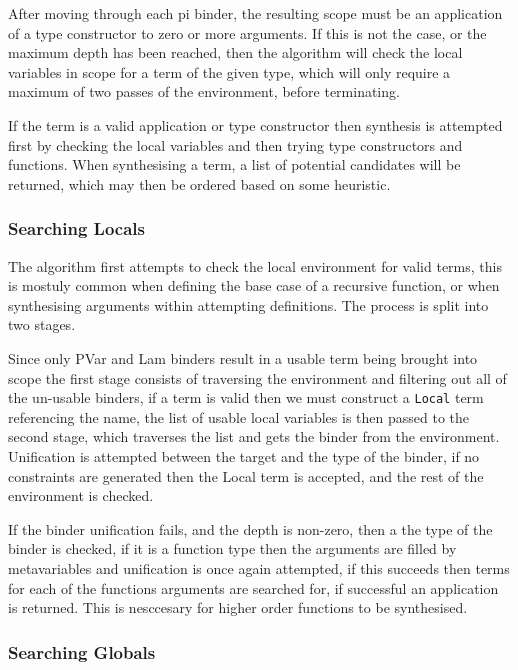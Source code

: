 \documentclass[a4paper]{article}
\begin{document}
After moving through each pi binder, the resulting scope must be an application of a type constructor to zero or more
arguments. If this is not the case, or the maximum depth has been reached, then the algorithm will check the local 
variables in scope for a term of the given type, which will only require a maximum of two passes of the environment,
before terminating. 

If the term is a valid application or type constructor then synthesis is attempted first by checking the 
local variables and then trying type constructors and functions. When synthesising a term, a list of potential 
candidates will be returned, which may then be ordered based on some heuristic.

\subsubsection{Searching Locals}
\label{sec:org19e0593}
The algorithm first attempts to check the local environment for valid terms, this is mostuly common when defining the 
base case of a recursive function, or when synthesising arguments within attempting definitions. The process is split 
into two stages. 

Since only PVar and Lam binders result in a usable term being brought into scope the first stage consists of traversing
the environment and filtering out all of the un-usable binders, if a term is valid then we must construct a \texttt{Local} 
term referencing the name, the list of usable local variables is then passed to the second stage, which traverses the 
list and gets the binder from the environment. Unification is attempted between the target and the type of the binder,
if no constraints are generated then the Local term is accepted, and the rest of the environment is checked. 

If the binder unification fails, and the depth is non-zero, then a the type of the binder is checked, if it is a 
function type then the arguments are filled by metavariables and unification is once again attempted, if this 
succeeds then terms for each of the functions arguments are searched for, if successful an application is returned. This
is nesccesary for higher order functions to be synthesised.   

\subsubsection{Searching Globals}
\label{sec:org13618f4}
\end{document}
